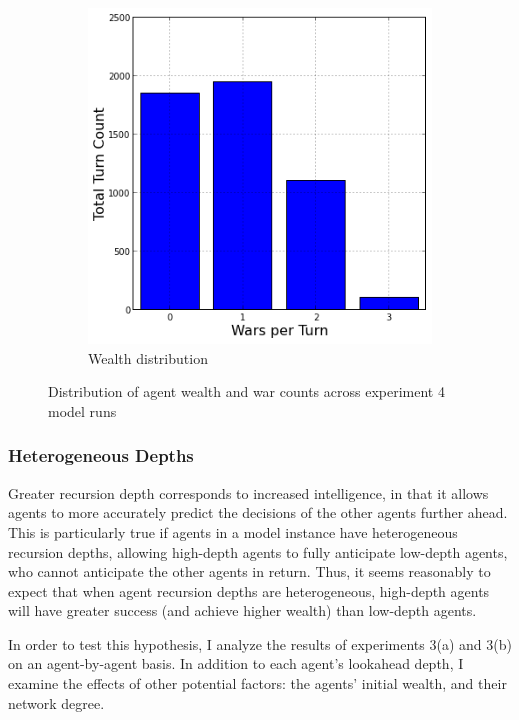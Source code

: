 \documentclass{article}
\begin{document}
\begin{figure}[h!]
\begin{subfigure}{0.49\textwidth}
		\includegraphics[width=\textwidth]{Graphics/Exp4WarDistribution}
		\caption{Wealth distribution}
	\end{subfigure}
\caption{Distribution of agent wealth and war counts across experiment 4 model runs}
\end{figure}


\subsubsection{Heterogeneous  Depths}

Greater recursion depth corresponds to increased intelligence, in that it allows agents to more accurately predict the decisions of the other agents further ahead. This is particularly true if agents in a model instance have heterogeneous  recursion depths, allowing high-depth agents to fully anticipate low-depth agents, who cannot anticipate the other agents in return. Thus, it seems reasonably to expect that when agent recursion depths are heterogeneous, high-depth agents will have greater success (and achieve higher wealth) than low-depth agents. 

In order to test this hypothesis, I analyze the results of experiments 3(a) and 3(b) on an agent-by-agent basis. In addition to each agent's lookahead depth, I examine the effects of other potential factors: the agents' initial wealth, and their network degree.
\end{document}
